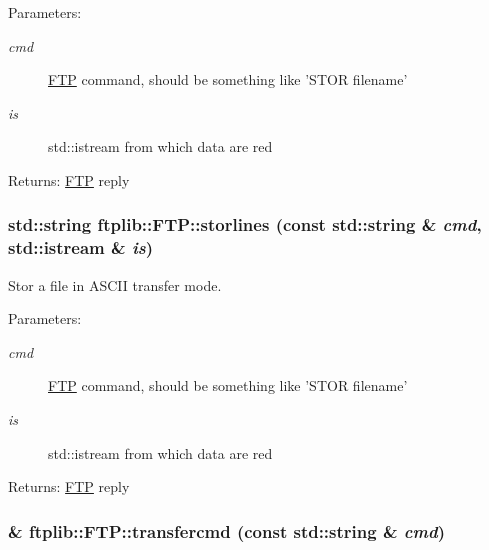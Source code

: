 \begin{Desc}
\item[Parameters:]
\begin{description}
\item[{\em cmd}]\hyperlink{classftplib_1_1FTP}{FTP} command, should be something like 'STOR filename' \item[{\em is}]std::istream from which data are red \end{description}
\end{Desc}
\begin{Desc}
\item[Returns:]\hyperlink{classftplib_1_1FTP}{FTP} reply \end{Desc}
\hypertarget{classftplib_1_1FTP_956c5fa0546d7a6a2db0b4dee28f6868}{
\subsubsection[{storlines}]{\setlength{\rightskip}{0pt plus 5cm}std::string ftplib::FTP::storlines (const std::string \& {\em cmd}, \/  std::istream \& {\em is})}}
\label{classftplib_1_1FTP_956c5fa0546d7a6a2db0b4dee28f6868}


Stor a file in ASCII transfer mode. 

\begin{Desc}
\item[Parameters:]
\begin{description}
\item[{\em cmd}]\hyperlink{classftplib_1_1FTP}{FTP} command, should be something like 'STOR filename' \item[{\em is}]std::istream from which data are red \end{description}
\end{Desc}
\begin{Desc}
\item[Returns:]\hyperlink{classftplib_1_1FTP}{FTP} reply \end{Desc}
\hypertarget{classftplib_1_1FTP_c949b3cd7b92534705ff041bb43d989b}{
\subsubsection[{transfercmd}]{ \& ftplib::FTP::transfercmd (const std::string \& {\em cmd})}}
\label{classftplib_1_1FTP_c949b3cd7b92534705ff041bb43d989b}



